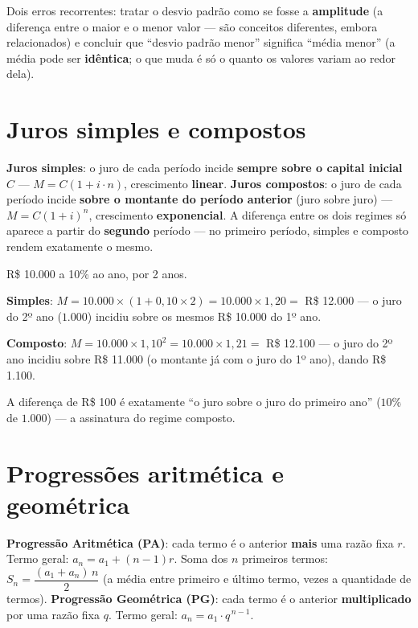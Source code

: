 \begin{cuidado}
Dois erros recorrentes: tratar o desvio padrão como se fosse a
\textbf{amplitude} (a diferença entre o maior e o menor valor --- são
conceitos diferentes, embora relacionados) e concluir que “desvio padrão
menor” significa “média menor” (a média pode ser \textbf{idêntica}; o que
muda é só o quanto os valores variam ao redor dela).
\end{cuidado}

\section{Juros simples e compostos}

\begin{conceito}
\textbf{Juros simples}: o juro de cada período incide \textbf{sempre sobre
o capital inicial} $C$ --- $M = C(1 + i \cdot n)$, crescimento
\textbf{linear}. \textbf{Juros compostos}: o juro de cada período incide
\textbf{sobre o montante do período anterior} (juro sobre juro) --- $M =
C(1+i)^n$, crescimento \textbf{exponencial}. A diferença entre os dois
regimes só aparece a partir do \textbf{segundo} período --- no primeiro
período, simples e composto rendem exatamente o mesmo.
\end{conceito}

\begin{exemplo}
R\$ 10.000 a 10\% ao ano, por 2 anos.

\textbf{Simples}: $M = 10.000 \times (1 + 0{,}10 \times 2) = 10.000 \times
1{,}20 = $ R\$ 12.000 --- o juro do 2º ano ($1.000$) incidiu sobre os
mesmos R\$ 10.000 do 1º ano.

\textbf{Composto}: $M = 10.000 \times 1{,}10^2 = 10.000 \times 1{,}21 = $
R\$ 12.100 --- o juro do 2º ano incidiu sobre R\$ 11.000 (o montante já
com o juro do 1º ano), dando R\$ 1.100.

A diferença de R\$ 100 é exatamente “o juro sobre o juro do primeiro
ano” ($10\%$ de $1.000$) --- a assinatura do regime composto.
\end{exemplo}

\section{Progressões aritmética e geométrica}

\begin{conceito}
\textbf{Progressão Aritmética (PA)}: cada termo é o anterior \textbf{mais}
uma razão fixa $r$. Termo geral: $a_n = a_1 + (n-1)r$. Soma dos $n$
primeiros termos: $S_n = \dfrac{(a_1+a_n)\,n}{2}$ (a média entre primeiro
e último termo, vezes a quantidade de termos).
\textbf{Progressão Geométrica (PG)}: cada termo é o anterior
\textbf{multiplicado} por uma razão fixa $q$. Termo geral: $a_n = a_1
\cdot q^{\,n-1}$.
\end{conceito}

